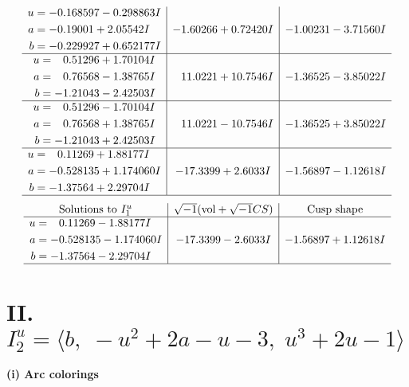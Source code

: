 \documentclass[1p]{elsarticle_modified}
\theoremstyle{definition}
\newcommand{\I}{\sqrt{-1}}
\begin{document}
$$\begin{array}{c|c|c}
\begin{aligned}
u &= -0.168597 - 0.298863 I \\
a &= -0.19001 + 2.05542 I \\
b &= -0.229927 + 0.652177 I\end{aligned}
 & -1.60266 + 0.72420 I & -1.00231 - 3.71560 I \\ \hline\begin{aligned}
u &= \phantom{-}0.51296 + 1.70104 I \\
a &= \phantom{-}0.76568 - 1.38765 I \\
b &= -1.21043 - 2.42503 I\end{aligned}
 & \phantom{-}11.0221 + 10.7546 I & -1.36525 - 3.85022 I \\ \hline\begin{aligned}
u &= \phantom{-}0.51296 - 1.70104 I \\
a &= \phantom{-}0.76568 + 1.38765 I \\
b &= -1.21043 + 2.42503 I\end{aligned}
 & \phantom{-}11.0221 - 10.7546 I & -1.36525 + 3.85022 I \\ \hline\begin{aligned}
u &= \phantom{-}0.11269 + 1.88177 I \\
a &= -0.528135 + 1.174060 I \\
b &= -1.37564 + 2.29704 I\end{aligned}
 & -17.3399 + 2.6033 I & -1.56897 - 1.12618 I\\
 \hline 
 \end{array}$$\newpage$$\begin{array}{c|c|c}  
\text{Solutions to }I^u_{1}& \I (\text{vol} + \sqrt{-1}CS) & \text{Cusp shape}\\
 \hline 
\begin{aligned}
u &= \phantom{-}0.11269 - 1.88177 I \\
a &= -0.528135 - 1.174060 I \\
b &= -1.37564 - 2.29704 I\end{aligned}
 & -17.3399 - 2.6033 I & -1.56897 + 1.12618 I\\
 \hline 
 \end{array}$$\newpage\newpage\renewcommand{\arraystretch}{1}
\centering \section*{II. $I^u_{2}= \langle b,\;- u^2+2 a- u-3,\;u^3+2 u-1 \rangle$}
\flushleft \textbf{(i) Arc colorings}\\
\end{document}
